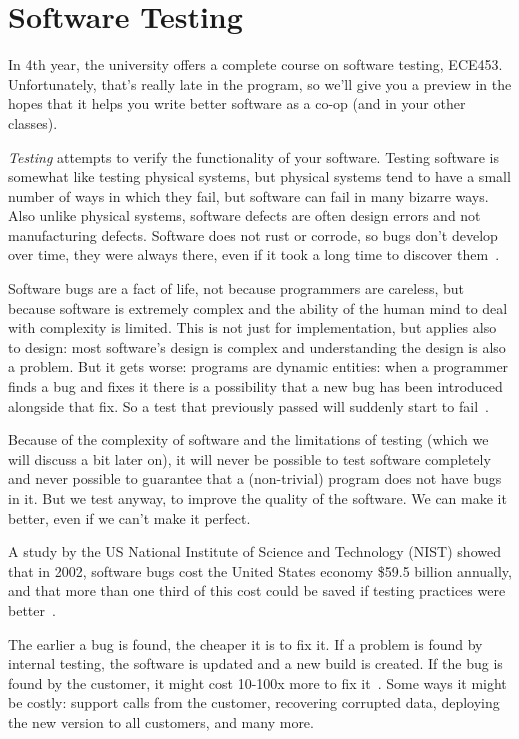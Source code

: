 




\section*{Software Testing}
In 4th year, the university offers a complete course on software testing, ECE453. Unfortunately, that's really late in the program, so we'll  give you a preview in the hopes that it helps you write better software as a co-op (and in your other classes).

\emph{Testing} attempts to verify the functionality of your software. Testing software is somewhat like testing physical systems, but physical systems tend to have a small number of ways in which they fail, but software can fail in many bizarre ways. Also unlike physical systems, software defects are often design errors and not manufacturing defects. Software does not rust or corrode, so bugs don't develop over time, they were always there, even if it took a long time to discover them~\cite{pantest}.

Software bugs are a fact of life, not because programmers are careless, but because software is extremely complex and the ability of the human mind to deal with complexity is limited. This is not just for implementation, but applies also to design: most software's design is complex and understanding the design is also a problem. But it gets worse: programs are dynamic entities: when a programmer finds a bug and fixes it there is a possibility that a new bug has been introduced alongside that fix. So a test that previously passed will suddenly start to fail~\cite{pantest}.

Because of the complexity of software and the limitations of testing (which we will discuss a bit later on), it will never be possible to test software completely and never possible to guarantee that a (non-trivial) program does not have bugs in it. But we test anyway, to improve the quality of the software. We can make it better, even if we can't make it perfect.

A study by the US National Institute of Science and Technology (NIST) showed that in 2002, software bugs cost the United States economy \$59.5 billion annually, and that more than one third of this cost could be saved if testing practices were better~\cite{nist}.

The earlier a bug is found, the cheaper it is to fix it. If a problem is found by internal testing, the software is updated and a new build is created. If the bug is found by the customer, it might cost 10-100x more to fix it~\cite{codecomplete}. Some ways it might be costly: support calls from the customer, recovering corrupted data, deploying the new version to all customers, and many more. 




